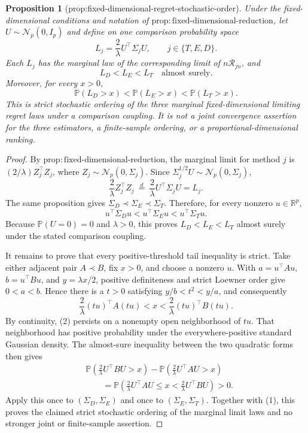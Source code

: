 \documentclass{article}
\newtheorem{proposition}{Proposition}
\begin{document}
\begin{proposition}[prop:fixed-dimensional-regret-stochastic-order]\label{prop:fixed-dimensional-regret-stochastic-order}
Under the fixed-dimensional conditions and notation of
\(\mathrm{prop{:}fixed\mbox{-}dimensional\mbox{-}reduction}\), let
\(U\sim\mathcal N_p(0,I_p)\) and define on one comparison probability space
\[
 L_j=\frac2\lambda U^\top\Sigma_jU,
 \qquad j\in\{T,E,D\}.
\]
Each \(L_j\) has the marginal law of the corresponding limit of
\(n\mathcal R_{jn}\), and
\[
 L_D<L_E<L_T\quad\text{almost surely}.
\]
Moreover, for every \(x>0\),
\[
 \mathbb P(L_D>x)<\mathbb P(L_E>x)<\mathbb P(L_T>x).
\]
This is strict stochastic ordering of the three marginal fixed-dimensional
limiting regret laws under a comparison coupling.  It is not a joint
convergence assertion for the three estimators, a finite-sample ordering, or
a proportional-dimensional ranking.
\end{proposition}
\begin{proof}
By \(\mathrm{prop{:}fixed\mbox{-}dimensional\mbox{-}reduction}\), the
marginal limit for method \(j\) is
\((2/\lambda)Z_j^\top Z_j\), where
\(Z_j\sim\mathcal N_p(0,\Sigma_j)\).  Since
\(\Sigma_j^{1/2}U\sim\mathcal N_p(0,\Sigma_j)\),
\[
 \frac2\lambda Z_j^\top Z_j
 \ \overset{d}=\ 
 \frac2\lambda U^\top\Sigma_jU=L_j.
 \tag{1}
\]
The same proposition gives
\(\Sigma_D\prec\Sigma_E\prec\Sigma_T\).  Therefore, for every nonzero
\(u\in\mathbb R^p\),
\[
 u^\top\Sigma_Du<u^\top\Sigma_Eu<u^\top\Sigma_Tu.
\]
Because \(\mathbb P(U=0)=0\) and \(\lambda>0\), this proves
\(L_D<L_E<L_T\) almost surely under the stated comparison coupling.

It remains to prove that every positive-threshold tail inequality is strict.
Take either adjacent pair \(A\prec B\), fix \(x>0\), and choose a nonzero
\(u\).  With
\(a=u^\top Au\), \(b=u^\top Bu\), and \(y=\lambda x/2\), positive
definiteness and strict Loewner order give \(0<a<b\).  Hence there is a
\(t>0\) satisfying \(y/b<t^2<y/a\), and consequently
\[
 \frac2\lambda (tu)^\top A(tu)<x<
 \frac2\lambda (tu)^\top B(tu).
 \tag{2}
\]
By continuity, (2) persists on a nonempty open neighborhood of \(tu\).  That
neighborhood has positive probability under the everywhere-positive standard
Gaussian density.  The almost-sure inequality between the two quadratic
forms then gives
\[
 \begin{aligned}
 &\mathbb P\!\left(\frac2\lambda U^\top BU>x\right)
 -\mathbb P\!\left(\frac2\lambda U^\top AU>x\right)\\
 &\qquad=
 \mathbb P\!\left(
  \frac2\lambda U^\top AU\le x<\frac2\lambda U^\top BU
 \right)>0.
 \end{aligned}
\]
Apply this once to \((\Sigma_D,\Sigma_E)\) and once to
\((\Sigma_E,\Sigma_T)\).  Together with (1), this proves the claimed strict
stochastic ordering of the marginal limit laws and no stronger joint or
finite-sample assertion.
\end{proof}
\end{document}
